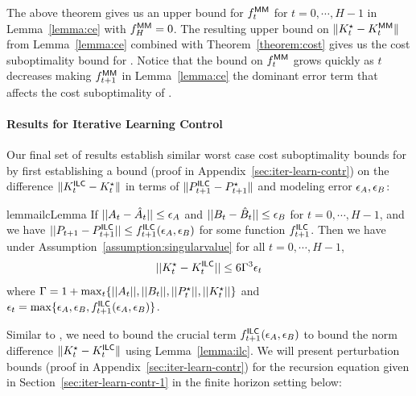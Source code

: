 The above theorem gives us an upper bound for $f^\mathsf{MM}_{t}$ for $t=0,
\cdots, H-1$ in
Lemma~\ref{lemma:ce} with $f^\mathsf{MM}_H = 0$. The resulting upper bound on $\|K^\star_t -
K^\mathsf{MM}_t\|$ from Lemma~\ref{lemma:ce} combined with
Theorem~\ref{theorem:cost} gives us the cost 
suboptimality bound for \MM{}. Notice that the
bound on $f^\mathsf{MM}_t$ grows quickly as $t$ decreases making $f^\mathsf{MM}_{t+1}$
in Lemma~\ref{lemma:ce} the dominant error term that affects the cost
suboptimality of \MM{}.

\paragraph{Results for Iterative Learning Control}
\label{sec:iter-learn-contr-3}

Our final set of results establish similar worst case cost
suboptimality bounds for \ILC{} by first establishing a bound (proof
in Appendix~\ref{sec:iter-learn-contr}) on the
difference $\|K^\mathsf{ILC}_t - K^\star_t\|$ in terms of $\|P^\mathsf{ILC}_{t+1} -
P^\star_{t+1}\|$ and modeling error $\epsilon_A, \epsilon_B$:
\begin{restatable}{lemma}{ilcLemma}
  \label{lemma:ilc}
  If $||A_{t} - \hat{A}_{t}|| \leq \epsilon_A$ and
  $||B_{t} - \hat{B}_{t}|| \leq \epsilon_B$ for $t=0, \cdots, H-1$, and we have
  $||P_{t+1} - P^\mathsf{ILC}_{t+1}|| \leq f^\mathsf{ILC}_{t+1}(\epsilon_A, \epsilon_B)$ for some function
  $f^\mathsf{ILC}_{t+1}$. Then we have under
  Assumption~\ref{assumption:singularvalue} for all $t=0, \cdots, H-1$,
  \begin{align}
    ||K^\star_{t} - K^\mathsf{ILC}_{t}|| \leq 6\Gamma^3\epsilon_t
    \label{eq:ilc-k-diff}
  \end{align}
  where
  $\Gamma = 1 + \max_{t}\{||A_{t}||, ||B_{t}||, ||P^\star_{t}||, ||K^\star_{t}||\}$
  and $\epsilon_{t} = \max\{\epsilon_A, \epsilon_B, f^\mathsf{ILC}_{t+1}(\epsilon_A,
  \epsilon_B)\}$. 
\end{restatable}
Similar to \MM{}, we need to bound the crucial term
$f^\mathsf{ILC}_{t+1}(\epsilon_A, \epsilon_B)$ to bound the norm difference $\|K^\star_t -
K^\mathsf{ILC}_t\|$ using Lemma~\ref{lemma:ilc}. We will present perturbation
bounds (proof in Appendix~\ref{sec:iter-learn-contr}) for the \ILC{}
recursion equation given in 
Section~\ref{sec:iter-learn-contr-1} in the finite horizon setting
below:

